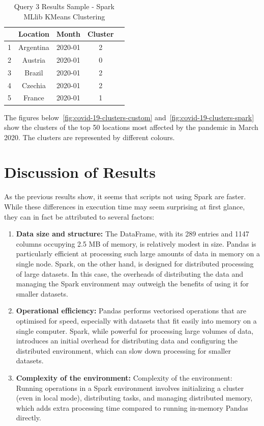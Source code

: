 \documentclass[12pt,oneside]{book} %
\begin{document}
\begin{table}[H]
    \centering
    \captionsetup{font=large}
    \caption{Query 3 Results Sample - Spark MLlib KMeans Clustering}
    \normalsize
    \begin{tabular}{|l|c|c|c|c|}
        \hline
          & Location  & Month   & Cluster \\
        \hline
        1 & Argentina & 2020-01 & 2       \\
        2 & Austria   & 2020-01 & 0       \\
        3 & Brazil    & 2020-01 & 2       \\
        4 & Czechia   & 2020-01 & 2       \\
        5 & France    & 2020-01 & 1       \\
        \hline
    \end{tabular}\label{tab:query3-spark-results-sample}
\end{table}

\newpage

The figures below~\ref{fig:covid-19-clusters-custom}
and~\ref{fig:covid-19-clusters-spark} show the clusters of the top 50 locations
most affected by the pandemic in March 2020. The clusters are represented by
different colours.

\newpage

\section{Discussion of Results}\label{sec:discussion-of-results}
As the previous results show, it seems that scripts not using Spark are faster.
While these differences in execution time may seem surprising at first glance,
they can in fact be attributed to several factors:

\begin{enumerate}
    \item \textbf{Data size and structure:} The DataFrame, with its 289 entries and 1147 columns occupying 2.5 MB of memory, is relatively modest in size. Pandas is particularly efficient at processing such large amounts of data in memory on a single node. Spark, on the other hand, is designed for distributed processing of large datasets. In this case, the overheads of distributing the data and managing the Spark environment may outweigh the benefits of using it for smaller datasets.
    \item \textbf{Operational efficiency:} Pandas performs vectorised operations that are optimised for speed, especially with datasets that fit easily into memory on a single computer. Spark, while powerful for processing large volumes of data, introduces an initial overhead for distributing data and configuring the distributed environment, which can slow down processing for smaller datasets.
    \item \textbf{Complexity of the environment:} Complexity of the environment: Running operations in a Spark environment involves initializing a cluster (even in local mode), distributing tasks, and managing distributed memory, which adds extra processing time compared to running in-memory Pandas directly.
\end{enumerate}
\end{document}
